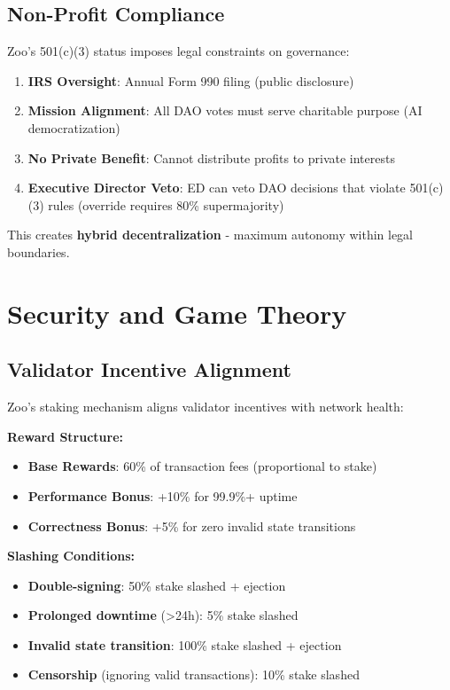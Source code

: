 \documentclass[11pt,letterpaper]{article}
\theoremstyle{definition}
\theoremstyle{remark}
\begin{document}
\subsection{Non-Profit Compliance}

Zoo's 501(c)(3) status imposes legal constraints on governance:

\begin{enumerate}
\item \textbf{IRS Oversight}: Annual Form 990 filing (public disclosure)
\item \textbf{Mission Alignment}: All DAO votes must serve charitable purpose (AI democratization)
\item \textbf{No Private Benefit}: Cannot distribute profits to private interests
\item \textbf{Executive Director Veto}: ED can veto DAO decisions that violate 501(c)(3) rules (override requires 80\% supermajority)
\end{enumerate}

This creates \textbf{hybrid decentralization} - maximum autonomy within legal boundaries.

\section{Security and Game Theory}

\subsection{Validator Incentive Alignment}

Zoo's staking mechanism aligns validator incentives with network health:

\textbf{Reward Structure:}
\begin{itemize}
\item \textbf{Base Rewards}: 60\% of transaction fees (proportional to stake)
\item \textbf{Performance Bonus}: +10\% for 99.9\%+ uptime
\item \textbf{Correctness Bonus}: +5\% for zero invalid state transitions
\end{itemize}

\textbf{Slashing Conditions:}
\begin{itemize}
\item \textbf{Double-signing}: 50\% stake slashed + ejection
\item \textbf{Prolonged downtime} (>24h): 5\% stake slashed
\item \textbf{Invalid state transition}: 100\% stake slashed + ejection
\item \textbf{Censorship} (ignoring valid transactions): 10\% stake slashed
\end{itemize}
\end{document}
